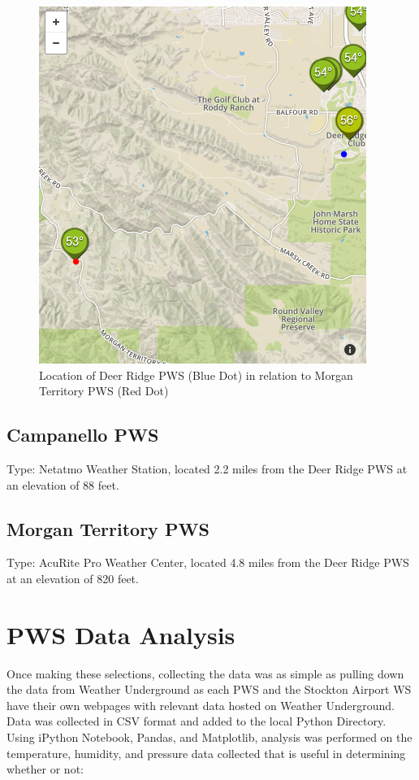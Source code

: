 \documentclass[sigconf]{acmart}
\begin{document}
\begin{figure}[p]
    \centering
    \includegraphics[width=.56\columnwidth]{images/DR_MTP.PNG}
    \caption{Location of Deer Ridge PWS (Blue Dot) in relation to Morgan Territory PWS (Red Dot)}
\end{figure}


\subsection{Campanello PWS}

Type: Netatmo Weather Station, located 2.2 miles from the Deer Ridge PWS at an elevation of 88 feet.


\subsection{Morgan Territory PWS} 

Type: AcuRite Pro Weather Center, located 4.8 miles from the Deer Ridge PWS at an elevation of 820 feet.


\section{PWS Data Analysis}

Once making these selections, collecting the data was as simple as pulling down the data from Weather Underground as each PWS and the Stockton Airport WS have their own webpages with relevant data hosted on Weather Underground.\cite{WundergroundDeerRidge2017} Data was collected in CSV format and added to the local Python Directory. Using iPython Notebook, Pandas, and Matplotlib, analysis was performed on the temperature, humidity, and pressure data collected that is useful in determining whether or not:
\end{document}
